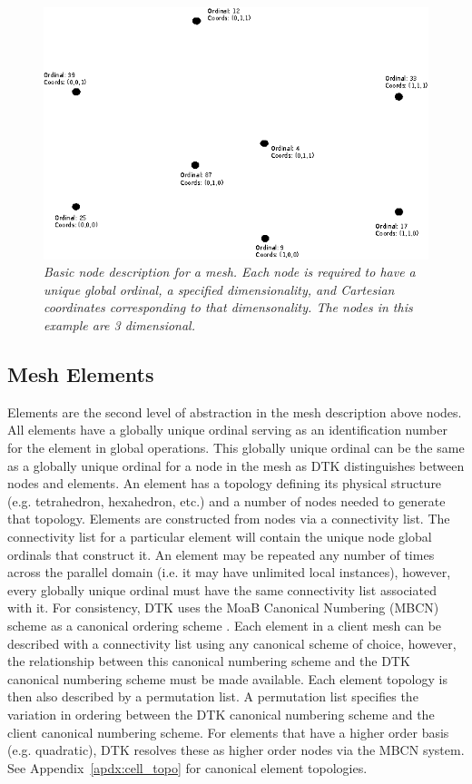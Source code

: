 \documentclass[letterpaper,12pt]{article}
\begin{document}
\begin{figure}[htpb!]
  \centering
  \includegraphics[width=5in]{hex_nodes.eps}
  \caption{\sl Basic node description for a mesh. Each node is
    required to have a unique global ordinal, a specified
    dimensionality, and Cartesian coordinates corresponding to that
    dimensonality. The nodes in this example are 3 dimensional.}
  \label{fig:mesh_nodes}
\end{figure}

\subsection{Mesh Elements}\label{subsec:elements}
Elements are the second level of abstraction in the mesh description
above nodes. All elements have a globally unique ordinal serving as an
identification number for the element in global operations. This
globally unique ordinal can be the same as a globally unique ordinal
for a node in the mesh as DTK distinguishes between nodes and
elements. An element has a topology defining its physical structure
(e.g. tetrahedron, hexahedron, etc.) and a number of nodes needed to
generate that topology. Elements are constructed from nodes via a
connectivity list. The connectivity list for a particular element will
contain the unique node global ordinals that construct it. An element
may be repeated any number of times across the parallel domain
(i.e. it may have unlimited local instances), however, every globally
unique ordinal must have the same connectivity list associated with
it. For consistency, DTK uses the MoaB Canonical Numbering (MBCN)
scheme as a canonical ordering scheme \cite{Tautges_2009}. Each
element in a client mesh can be described with a connectivity list
using any canonical scheme of choice, however, the relationship
between this canonical numbering scheme and the DTK canonical
numbering scheme must be made available. Each element topology is then
also described by a permutation list. A permutation list specifies the
variation in ordering between the DTK canonical numbering scheme and
the client canonical numbering scheme. For elements that have a higher
order basis (e.g. quadratic), DTK resolves these as higher order nodes
via the MBCN system. See Appendix~\ref{apdx:cell_topo} for canonical
element topologies.
\end{document}
